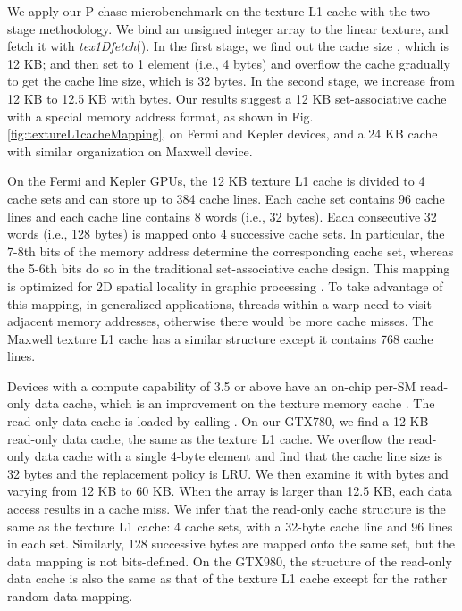 \documentclass[10pt,journal,compsoc]{IEEEtran}
\theoremstyle{definition}
\begin{document}
We apply our P-chase microbenchmark on the texture L1 cache with the two-stage methodology. We bind an unsigned integer array to the linear texture, and fetch it with \emph{tex1Dfetch}(). In the first stage, we find out the cache size , which is 12 KB; and then set  to 1 element (i.e., 4 bytes) and overflow the cache gradually to get the cache line size, which is 32 bytes. In the second stage, we increase  from 12 KB to 12.5 KB with  bytes. Our results suggest a 12 KB set-associative cache with a special memory address format, as shown in Fig. \ref{fig:textureL1cacheMapping}, on Fermi and Kepler devices, and a 24 KB cache with similar organization on Maxwell device.

On the Fermi and Kepler GPUs, the 12 KB texture L1 cache is divided to 4 cache sets and can store up to 384 cache lines. Each cache set contains 96 cache lines and each cache line contains 8 words (i.e., 32 bytes). Each consecutive 32 words (i.e., 128 bytes) is mapped onto 4 successive cache sets. In particular, the 7-8th bits of the memory address determine the corresponding cache set, whereas the 5-6th bits do so in the traditional set-associative cache design. This mapping is optimized for 2D spatial locality in graphic processing \cite{cudabestguide,hakura1997design}. To take advantage of this mapping, in generalized applications, threads within a warp need to visit adjacent memory addresses, otherwise there would be more cache misses. The Maxwell texture L1 cache has a similar structure except it contains 768 cache lines.



Devices with a compute capability of 3.5 or above have an on-chip per-SM read-only data cache, which is an improvement on the texture memory cache \cite{keplerwhitepaper}. The read-only data cache is loaded by calling . On our GTX780, we find a 12 KB read-only data cache, the same as the texture L1 cache. We overflow the read-only data cache with a single 4-byte element and find that the cache line size is 32 bytes and the replacement policy is LRU. We then examine it with  bytes and  varying from 12 KB to 60 KB. When the array is larger than 12.5 KB, each data access results in a cache miss. We infer that the read-only cache structure is the same as the texture L1 cache: 4 cache sets, with a 32-byte cache line and 96 lines in each set. Similarly, 128 successive bytes are mapped onto the same set, but the data mapping is not bits-defined. On the GTX980, the structure of the read-only data cache is also the same as that of the texture L1 cache except for the rather random data mapping.
\end{document}
